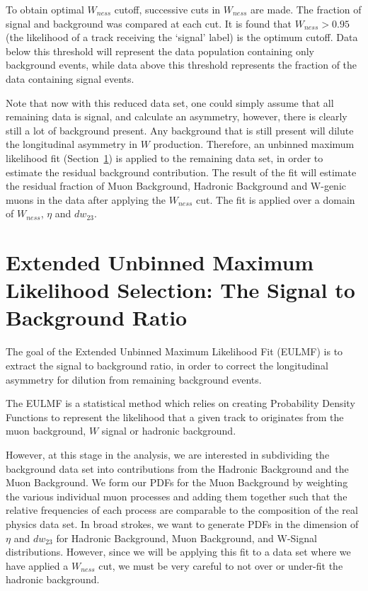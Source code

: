To obtain optimal $W_{ness}$ cutoff, successive cuts in $W_{ness}$ are made. The
fraction of signal and background was compared at each cut. It is found that
$W_{ness} > 0.95$ (the likelihood of a track receiving the `signal' label) is
the optimum cutoff. Data below this threshold will represent the data population
containing only background events, while data above this threshold represents
the fraction of the data containing signal events.

Note that now with this reduced data set, one could simply assume that all
remaining data is signal, and calculate an asymmetry, however, there is clearly
still a lot of background present. Any background that is still present will
dilute the longitudinal asymmetry in $W$ production. Therefore, an unbinned
maximum likelihood fit (Section~\ref{sec:sbr}) is applied to the remaining data
set, in order to estimate the residual background contribution. The result of
the fit will estimate the residual fraction of Muon Background, Hadronic
Background and W-genic muons in the data after applying the $W_{ness}$ cut.  The
fit is applied over a domain of $W_{ness}$, $\eta$ and $dw_{23}$. 

\clearpage
\section{Extended Unbinned Maximum Likelihood Selection: The Signal to
Background Ratio}
\label{sec:sbr}

The goal of the Extended Unbinned Maximum Likelihood Fit (EULMF) is to extract
the signal to background ratio, in order to correct the longitudinal asymmetry
for dilution from remaining background events.

The EULMF is a statistical method which relies on creating Probability
Density Functions to represent the likelihood that a given track to originates
from the muon background, $W$ signal or hadronic background.

\edithere{}

However, at this stage in the analysis, we are interested in
subdividing the background data set into contributions from the Hadronic
Background and the Muon Background. We form our PDFs for the Muon Background by
weighting the various individual muon processes and adding them together such
that the relative frequencies of each process are comparable to the composition
of the real physics data set. In broad strokes, we want to generate PDFs in the
dimension of $\eta$ and $dw_{23}$ for Hadronic Background, Muon Background, and
W-Signal distributions. However, since we will be applying this fit to a data
set where we have applied a $W_{ness}$ cut, we must be very careful to not over
or under-fit the hadronic background. 


